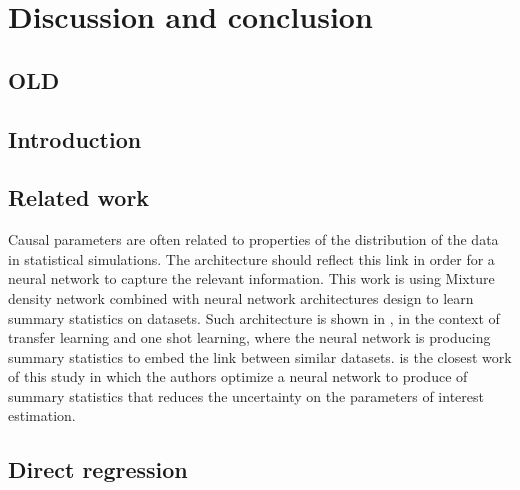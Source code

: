 
\chapter{Discussion and conclusion}
\label{chap:conclusion}
\ifpdf
    \graphicspath{{Chapter5/Figs/Raster/}{Chapter5/Figs/PDF/}{Chapter5/Figs/}}
\else
    \graphicspath{{Chapter5/Figs/Vector/}{Chapter5/Figs/}}
\fi



\section{OLD} %


\section{Introduction}


\section{Related work}




Causal parameters are often related to properties of the distribution of the data in statistical simulations.
The architecture should reflect this link in order for a neural network to capture the relevant information.
This work is using Mixture density network \cite{Bishop94mixturedensity} combined with neural network architectures design to learn summary statistics on datasets.
Such architecture is shown in \cite{Edwards17neuralstatistician}, in the context of transfer learning and one shot learning, where the neural network is producing summary statistics to embed the link between similar datasets.
\cite{DECASTRO2019170inferno} is the closest work of this study in which the authors optimize a neural network to produce of summary statistics that reduces the uncertainty on the parameters of interest estimation.


\section{Direct regression}



